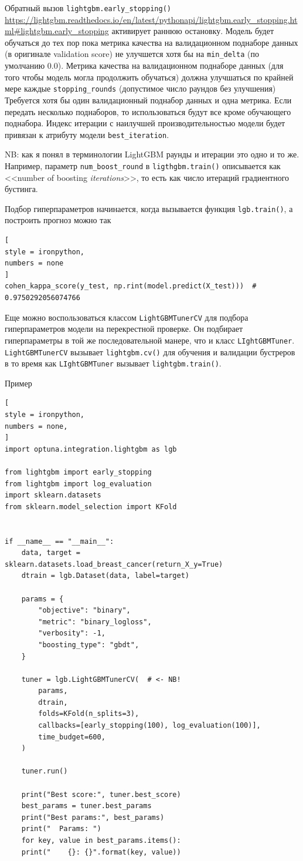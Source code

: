 \documentclass[%
	11pt,
	a4paper,
	utf8,
		]{article}
\begin{document}
Обратный вызов \verb|lightgbm.early_stopping()| \url{https://lightgbm.readthedocs.io/en/latest/pythonapi/lightgbm.early_stopping.html#lightgbm.early_stopping} активирует раннюю остановку. Модель будет обучаться до тех пор пока метрика качества на валидационном поднаборе данных (в оригинале validation score) не улучшется хотя бы на \verb|min_delta| (по умолчанию 0.0). Метрика качества на валидационном поднаборе данных (для того чтобы модель могла продолжить обучаться) должна улучшаться по крайней мере каждые \verb|stopping_rounds| (допустимое число раундов без улучшения) Требуется хотя бы один валидационный поднабор данных и одна метрика. Если передать несколько поднаборов, то использоваться будут все кроме обучающего поднабора. Индекс итерации с наилучшей производительностью модели будет привязан к атрибуту модели \verb|best_iteration|.

NB: как я понял в терминологии LightGBM раунды и итерации это одно и то же. Например, параметр \verb|num_boost_round| в \verb|ligthgbm.train()| описывается как <<number of boosting \emph{iterations}>>, то есть как число итераций градиентного бустинга.

Подбор гиперпараметров начинается, когда вызывается функция \verb|lgb.train()|, а построить прогноз можно так
\begin{lstlisting}[
style = ironpython,
numbers = none
]
cohen_kappa_score(y_test, np.rint(model.predict(X_test)))  # 0.9750292056074766
\end{lstlisting}

Еще можно воспользоваться классом \verb|LightGBMTunerCV| для подбора гиперпараметров модели на перекрестной проверке. Он подбирает гиперпараметры в той же последовательной манере, что и класс \verb|LIghtGBMTuner|. \verb|LightGBMTunerCV| вызывает \verb|lightgbm.cv()| для обучения и валидации бустреров в то время как \verb|LIghtGBMTuner| вызывает \verb|lightgbm.train()|.

Пример
\begin{lstlisting}[
style = ironpython,
numbers = none,
]
import optuna.integration.lightgbm as lgb

from lightgbm import early_stopping
from lightgbm import log_evaluation
import sklearn.datasets
from sklearn.model_selection import KFold


if __name__ == "__main__":
	data, target = sklearn.datasets.load_breast_cancer(return_X_y=True)
	dtrain = lgb.Dataset(data, label=target)

	params = {
		"objective": "binary",
		"metric": "binary_logloss",
		"verbosity": -1,
		"boosting_type": "gbdt",
	}

	tuner = lgb.LightGBMTunerCV(  # <- NB!
		params,
		dtrain,
		folds=KFold(n_splits=3),
		callbacks=[early_stopping(100), log_evaluation(100)],
		time_budget=600,
	)

	tuner.run()

	print("Best score:", tuner.best_score)
	best_params = tuner.best_params
	print("Best params:", best_params)
	print("  Params: ")
	for key, value in best_params.items():
	print("    {}: {}".format(key, value))
\end{lstlisting}
\end{document}
